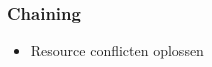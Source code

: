\begin{frame}\frametitle{Chaining}
\begin{itemize}
    
    \item Resource conflicten oplossen
\end{itemize}
\end{frame}

